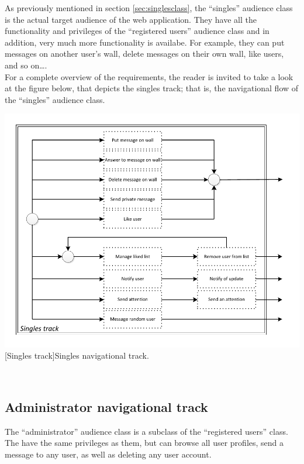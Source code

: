 \documentclass[11pt, a4paper,svglistings,oneside]{book}
\begin{document}
As previously mentioned in section \ref{sec:singlesclass}, the ``singles'' audience class is the actual target audience of the web application. They have all the functionality and privileges of the ``registered users'' audience class and in addition, very much more functionality is availabe. For example, they can put messages on another user's wall, delete messages on their own wall, like users, and so on\ldots.\\
For a complete overview of the requirements, the reader is invited to take a look at the figure below, that depicts the singles track; that is, the navigational flow of the ``singles'' audience class.
$\;$ \\
\noindent\begin{minipage}{\textwidth}
    \centering
   \includegraphics[scale=1]{Nav_Singles_Track.pdf}
 [Singles track]{Singles navigational track.}
\end{minipage}
$\;$ \\ 

\subsection{Administrator navigational track}

The ``administrator'' audience class is a subclass of the ``registered users'' class. The have the same privileges as them, but can browse all user profiles, send a message to any user, as well as deleting any user account.
\end{document}
